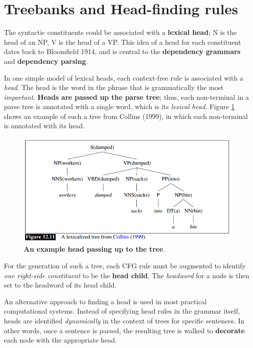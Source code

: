 \documentclass[11pt]{article}
\begin{document}
\section{Treebanks and Head-finding rules}
The syntactic constituents could be associated with a \textbf{lexical head}; N is the head of an NP, V is the head of a VP.  This idea of a head
for each constituent dates back to Bloomfield 1914, and is central to the \textbf{dependency grammars} and \textbf{dependency parsing}.

In one simple model of lexical heads, each context-free rule is associated with a \emph{head}. The head is the word in the phrase that is grammatically the most \emph{important}. \textbf{Heads are passed up the parse tree}; thus, each non-terminal in a parse tree is annotated with a single word, which is its \emph{lexical head}.
Figure \ref{fig: head_finding} shows an example of such a tree from Collins (1999), in which each non-terminal is annotated with its head.

\begin{figure}
\begin{minipage}[t]{1\linewidth}
  \centering
  \centerline{\includegraphics[scale = 0.5]{head_finding.png}}
\end{minipage}
\caption{\footnotesize{\textbf{An example head passing up to the tree}.}}
\label{fig: head_finding}
\end{figure}

For the generation of such a tree, each CFG rule must be augmented to identify \emph{one right-side constituent} to be the \textbf{head child}. The \emph{headword} for a node is then set to the headword of its head child. 

An alternative approach to finding a head is used in most practical computational systems. Instead of specifying head rules in the grammar itself, heads are identified
\emph{dynamically} in the context of trees for specific sentences. In other words, once a sentence is parsed, the resulting tree is walked to \textbf{decorate} each node with the appropriate head. 
\end{document}
